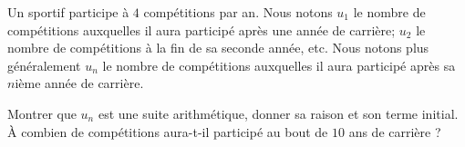 
\begin{exercice}\label{exosmath-0166}

    Un sportif participe à \( 4\) compétitions par an. Nous notons \( u_1\) le nombre de compétitions auxquelles il aura participé après une année de carrière; \( u_2\) le nombre de compétitions à la fin de sa seconde année, etc. Nous notons plus généralement \( u_n\) le nombre de compétitions auxquelles il aura participé après sa \( n\)ième année de carrière.

    Montrer que \( u_n\) est une suite arithmétique, donner sa raison et son terme initial. À combien de compétitions aura-t-il participé au bout de \( 10\) ans de carrière ?

\end{exercice}
